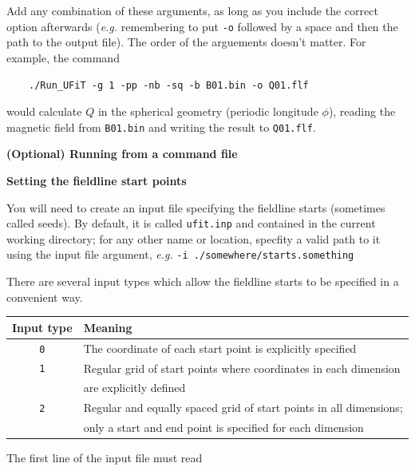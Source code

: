 \documentclass[12pt,twoside]{article}
\begin{document}
\vspace{2mm}

Add any combination of these arguments, as long as you include the correct option afterwards (\textit{e.g.} remembering to put \texttt{-o} followed by a space and then the path to the output file). The order of the arguements doesn't matter. For example, the command

$\quad\quad$\texttt{./Run\_UFiT -g 1 -pp -nb -sq -b B01.bin -o Q01.flf}

would calculate $Q$ in the spherical geometry (periodic longitude $\phi$), reading the magnetic field from \texttt{B01.bin} and writing the result to \texttt{Q01.flf}.


\vspace{2mm}
{\Large \textbf{(Optional) Running from a command file}}


\vspace{2mm}
{\Large \textbf{Setting the fieldline start points}}

You will need to create an input file specifying the fieldline starts (sometimes called seeds). By default, it is called \texttt{ufit.inp} and contained in the current working directory; for any other name or location, specfity a valid path to it using the input file argument, \textit{e.g.} \texttt{-i ./somewhere/starts.something}

There are several input types which allow the fieldline starts to be specified in a convenient way.

\vspace{2mm}

\begin{tabular}{|c|l|}		
		\hline
		\textbf{Input type} & \textbf{Meaning} \\\hline\hline
		\texttt{0} & The coordinate of each start point is explicitly specified \\\hline
		\texttt{1} & Regular grid of start points where coordinates in each dimension  \\
		           & are explicitly defined  \\\hline
		\texttt{2} & Regular and equally spaced grid of start points in all dimensions; \\
		           & only a start and end point is specified for each dimension \\\hline
\end{tabular}

\vspace{2mm}

The first line of the input file must read 
\end{document}
